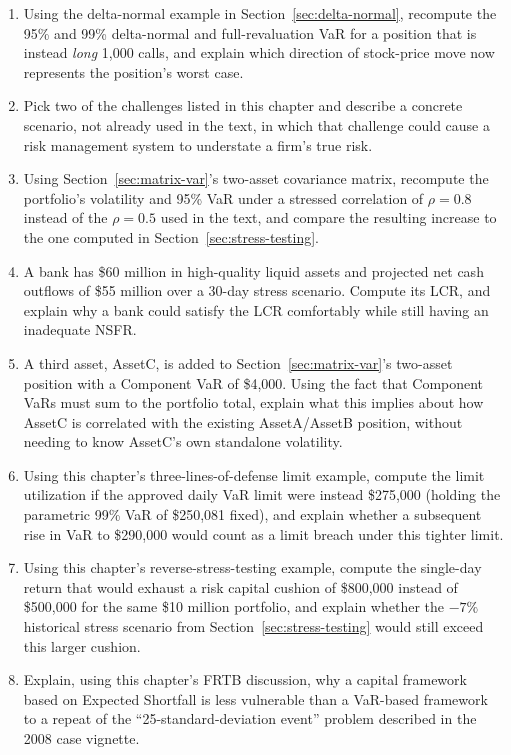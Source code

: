 \documentclass[../ai_in_finance]{subfiles}
\begin{document}
\begin{enumerate}
    \item Using the delta-normal example in Section~\ref{sec:delta-normal}, recompute the 95\% and 99\% delta-normal and full-revaluation VaR for a position that is instead \emph{long} 1,000 calls, and explain which direction of stock-price move now represents the position's worst case.
    \item Pick two of the challenges listed in this chapter and describe a concrete scenario, not already used in the text, in which that challenge could cause a risk management system to understate a firm's true risk.
    \item Using Section~\ref{sec:matrix-var}'s two-asset covariance matrix, recompute the portfolio's volatility and 95\% VaR under a stressed correlation of $\rho=0.8$ instead of the $\rho=0.5$ used in the text, and compare the resulting increase to the one computed in Section~\ref{sec:stress-testing}.
    \item A bank has \$60 million in high-quality liquid assets and projected net cash outflows of \$55 million over a 30-day stress scenario. Compute its LCR, and explain why a bank could satisfy the LCR comfortably while still having an inadequate NSFR.
    \item A third asset, AssetC, is added to Section~\ref{sec:matrix-var}'s two-asset position with a Component VaR of \$4,000. Using the fact that Component VaRs must sum to the portfolio total, explain what this implies about how AssetC is correlated with the existing AssetA/AssetB position, without needing to know AssetC's own standalone volatility.
    \item Using this chapter's three-lines-of-defense limit example, compute the limit utilization if the approved daily VaR limit were instead \$275,000 (holding the parametric 99\% VaR of \$250,081 fixed), and explain whether a subsequent rise in VaR to \$290,000 would count as a limit breach under this tighter limit.
    \item Using this chapter's reverse-stress-testing example, compute the single-day return that would exhaust a risk capital cushion of \$800,000 instead of \$500,000 for the same \$10 million portfolio, and explain whether the $-7\%$ historical stress scenario from Section~\ref{sec:stress-testing} would still exceed this larger cushion.
    \item Explain, using this chapter's FRTB discussion, why a capital framework based on Expected Shortfall is less vulnerable than a VaR-based framework to a repeat of the ``25-standard-deviation event'' problem described in the 2008 case vignette.

\end{enumerate}
\end{document}

